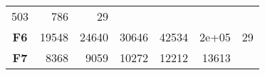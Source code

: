 \documentclass[12pt,a4paper]{article}
\begin{document}
\begin{longtable}[c]{@{}crrrrrr@{}}
\begin{minipage}[t]{0.10\columnwidth}
503
\strut\end{minipage} &
\begin{minipage}[t]{0.11\columnwidth}\raggedleft\strut
786
\strut\end{minipage} &
\begin{minipage}[t]{0.07\columnwidth}\raggedleft\strut
29
\strut\end{minipage}\tabularnewline
\begin{minipage}[t]{0.11\columnwidth}\centering\strut
\textbf{F6}
\strut\end{minipage} &
\begin{minipage}[t]{0.08\columnwidth}\raggedleft\strut
19548
\strut\end{minipage} &
\begin{minipage}[t]{0.08\columnwidth}\raggedleft\strut
24640
\strut\end{minipage} &
\begin{minipage}[t]{0.09\columnwidth}\raggedleft\strut
30646
\strut\end{minipage} &
\begin{minipage}[t]{0.10\columnwidth}\raggedleft\strut
42534
\strut\end{minipage} &
\begin{minipage}[t]{0.11\columnwidth}\raggedleft\strut
2e+05
\strut\end{minipage} &
\begin{minipage}[t]{0.07\columnwidth}\raggedleft\strut
29
\strut\end{minipage}\tabularnewline
\begin{minipage}[t]{0.11\columnwidth}\centering\strut
\textbf{F7}
\strut\end{minipage} &
\begin{minipage}[t]{0.08\columnwidth}\raggedleft\strut
8368
\strut\end{minipage} &
\begin{minipage}[t]{0.08\columnwidth}\raggedleft\strut
9059
\strut\end{minipage} &
\begin{minipage}[t]{0.09\columnwidth}\raggedleft\strut
10272
\strut\end{minipage} &
\begin{minipage}[t]{0.10\columnwidth}\raggedleft\strut
12212
\strut\end{minipage} &
\begin{minipage}[t]{0.11\columnwidth}\raggedleft\strut
13613
\strut\end{minipage} &
\begin{minipage}[t]{0.07\columnwidth}\raggedleft\strut

\end{minipage}
\end{longtable}
\end{document}
